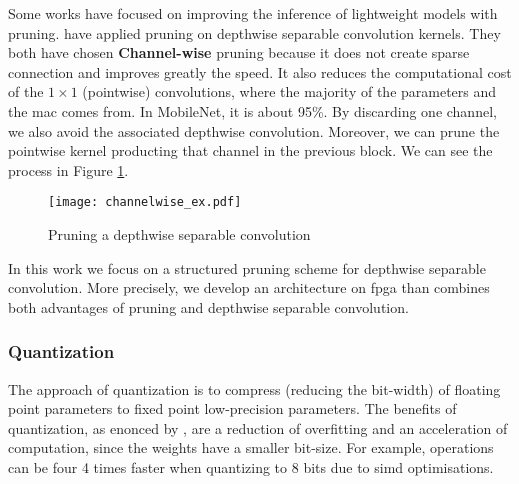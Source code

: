 %
Some works have focused on improving the inference of lightweight models with pruning. \textcite{zhang_channel_2019, tu_pruning_2019} have applied pruning on depthwise separable convolution kernels. They both have chosen \textbf{Channel-wise} pruning because it does not create sparse connection and improves greatly the speed. It also reduces the computational cost of the $1 \times 1$ (pointwise) convolutions, where the majority of the parameters and the \acrshort{mac} comes from. In MobileNet, it is about 95\%. By discarding one channel, we also avoid the associated depthwise convolution.
Moreover, we can prune the pointwise kernel producting that channel in the previous block. We can see the process in Figure \ref{fig:pruning_dsc}.
%
\begin{figure}
    \centering
    \texttt{[image: channelwise\_ex.pdf]}
    \caption{Pruning a depthwise separable convolution \cite{tu_pruning_2019}}
    \label{fig:pruning_dsc}
\end{figure}

In this work we focus on a structured pruning scheme for depthwise separable convolution. More precisely, we develop an architecture on \acrshort{fpga} than combines both advantages of pruning and depthwise separable convolution.
%
%
\subsubsection{Quantization} \label{subs:quantization}
The approach of quantization is to compress (reducing the bit-width) of floating point parameters to fixed point low-precision parameters. The benefits of quantization, as enonced by \cite{joos_de_ter_beerst_accelerating_2019}, are a reduction of overfitting and an acceleration of computation, since the weights have a smaller bit-size. For example, operations can be four 4 times faster when quantizing to 8 bits due to \acrshort{simd} optimisations.

